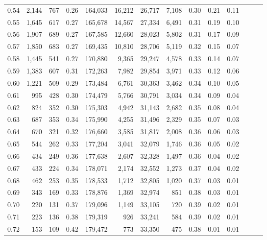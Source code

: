 \begin{tabular}{rrrrrrrrrrrrrr}
0.54 &  2,144 &    767 &  0.26 &  164,033 &   16,212 &  26,717 &   7,108 &  0.30 &  0.21 &      0.11 \\
0.55 &  1,645 &    617 &  0.27 &  165,678 &   14,567 &  27,334 &   6,491 &  0.31 &  0.19 &      0.10 \\
0.56 &  1,907 &    689 &  0.27 &  167,585 &   12,660 &  28,023 &   5,802 &  0.31 &  0.17 &      0.09 \\
0.57 &  1,850 &    683 &  0.27 &  169,435 &   10,810 &  28,706 &   5,119 &  0.32 &  0.15 &      0.07 \\
0.58 &  1,445 &    541 &  0.27 &  170,880 &    9,365 &  29,247 &   4,578 &  0.33 &  0.14 &      0.07 \\
0.59 &  1,383 &    607 &  0.31 &  172,263 &    7,982 &  29,854 &   3,971 &  0.33 &  0.12 &      0.06 \\
0.60 &  1,221 &    509 &  0.29 &  173,484 &    6,761 &  30,363 &   3,462 &  0.34 &  0.10 &      0.05 \\
0.61 &    995 &    428 &  0.30 &  174,479 &    5,766 &  30,791 &   3,034 &  0.34 &  0.09 &      0.04 \\
0.62 &    824 &    352 &  0.30 &  175,303 &    4,942 &  31,143 &   2,682 &  0.35 &  0.08 &      0.04 \\
0.63 &    687 &    353 &  0.34 &  175,990 &    4,255 &  31,496 &   2,329 &  0.35 &  0.07 &      0.03 \\
0.64 &    670 &    321 &  0.32 &  176,660 &    3,585 &  31,817 &   2,008 &  0.36 &  0.06 &      0.03 \\
0.65 &    544 &    262 &  0.33 &  177,204 &    3,041 &  32,079 &   1,746 &  0.36 &  0.05 &      0.02 \\
0.66 &    434 &    249 &  0.36 &  177,638 &    2,607 &  32,328 &   1,497 &  0.36 &  0.04 &      0.02 \\
0.67 &    433 &    224 &  0.34 &  178,071 &    2,174 &  32,552 &   1,273 &  0.37 &  0.04 &      0.02 \\
0.68 &    462 &    253 &  0.35 &  178,533 &    1,712 &  32,805 &   1,020 &  0.37 &  0.03 &      0.01 \\
0.69 &    343 &    169 &  0.33 &  178,876 &    1,369 &  32,974 &     851 &  0.38 &  0.03 &      0.01 \\
0.70 &    220 &    131 &  0.37 &  179,096 &    1,149 &  33,105 &     720 &  0.39 &  0.02 &      0.01 \\
0.71 &    223 &    136 &  0.38 &  179,319 &      926 &  33,241 &     584 &  0.39 &  0.02 &      0.01 \\
0.72 &    153 &    109 &  0.42 &  179,472 &      773 &  33,350 &     475 &  0.38 &  0.01 &      0.01 \\

\end{tabular}
